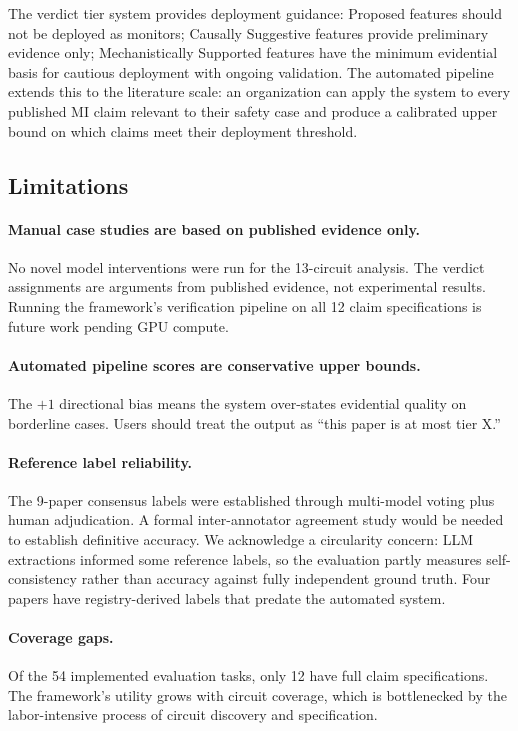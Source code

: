 \documentclass[10pt]{article}
\begin{document}
The verdict tier system provides deployment guidance: Proposed features should not be deployed as monitors; Causally Suggestive features provide preliminary evidence only; Mechanistically Supported features have the minimum evidential basis for cautious deployment with ongoing validation. The automated pipeline extends this to the literature scale: an organization can apply the system to every published MI claim relevant to their safety case and produce a calibrated upper bound on which claims meet their deployment threshold.

\subsection{Limitations}

\paragraph{Manual case studies are based on published evidence only.} No novel model interventions were run for the 13-circuit analysis. The verdict assignments are arguments from published evidence, not experimental results. Running the framework's verification pipeline on all 12 claim specifications is future work pending GPU compute.

\paragraph{Automated pipeline scores are conservative upper bounds.} The $+1$ directional bias means the system over-states evidential quality on borderline cases. Users should treat the output as ``this paper is at most tier X.''

\paragraph{Reference label reliability.} The 9-paper consensus labels were established through multi-model voting plus human adjudication. A formal inter-annotator agreement study would be needed to establish definitive accuracy. We acknowledge a circularity concern: LLM extractions informed some reference labels, so the evaluation partly measures self-consistency rather than accuracy against fully independent ground truth. Four papers have registry-derived labels that predate the automated system.

\paragraph{Coverage gaps.} Of the 54 implemented evaluation tasks, only 12 have full claim specifications. The framework's utility grows with circuit coverage, which is bottlenecked by the labor-intensive process of circuit discovery and specification.
\end{document}

